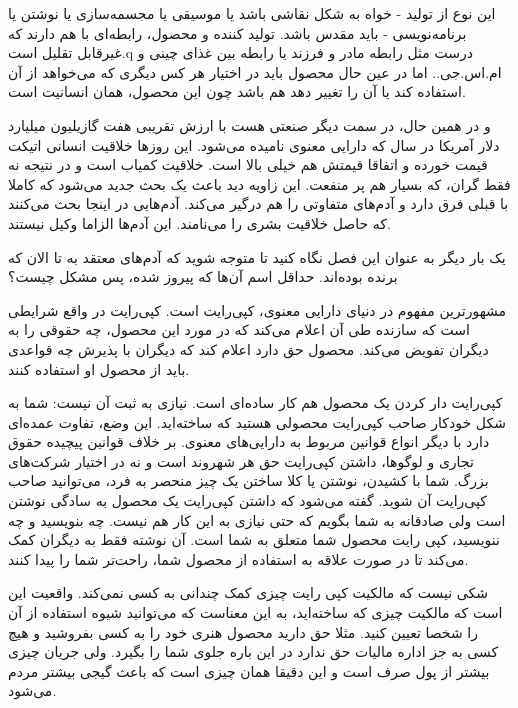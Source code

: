 این نوع از تولید - خواه به شکل نقاشی باشد یا موسیقی یا مجسمه‌سازی یا نوشتن یا برنامه‌نویسی - باید مقدس باشد. تولید کننده و محصول، رابطه‌ای با هم دارند که غیرقابل تقلیل است.q درست مثل رابطه مادر و فرزند یا رابطه بین غذای چینی و ام.اس.جی.. اما در عین حال محصول باید در اختیار هر کس دیگری که می‌خواهد از آن استفاده کند یا آن را تغییر دهد هم باشد چون این محصول، همان انسانیت است.

و در همین حال، در سمت دیگر صنعتی هست با ارزش تقریبی هفت گازیلیون
میلیارد دلار آمریکا در سال که دارایی معنوی نامیده می‌شود. این روزها
خلاقیت انسانی اتیکت قیمت خورده و اتفاقا قیمتش هم خیلی بالا است. خلاقیت
کمیاب است و در نتیجه نه فقط گران، که بسیار هم پر منفعت. این زاویه دید
باعث یک بحث جدید می‌شود که کاملا با قبلی فرق دارد و آدم‌های متفاوتی را
هم درگیر می‌کند. آدم‌هایی در اینجا بحث می‌کنند که حاصل خلاقیت بشری را
 می‌نامند. این آدم‌ها الزاما وکیل نیستند.

یک بار دیگر به عنوان این فصل نگاه کنید تا متوجه شوید که آدم‌های معتقد
به  تا الان که برنده بوده‌اند. حداقل اسم آن‌ها که پیروز
شده، پس مشکل چیست؟

مشهورترین مفهوم در دنیای دارایی معنوی، کپی‌رایت است. کپی‌رایت در واقع
شرایطی است که سازنده طی آن اعلام می‌کند که در مورد این محصول، چه حقوقی
را به دیگران تفویض می‌کند.  محصول حق دارد اعلام کند که
دیگران با پذیرش چه قواعدی باید از محصول او استفاده کنند.

کپی‌رایت دار کردن یک محصول هم کار ساده‌ای است. نیازی به ثبت آن نیست: شما
به شکل خودکار صاحب کپی‌رایت محصولی هستید که ساخته‌اید. این وضع، تفاوت
عمده‌ای دارد با دیگر انواع قوانین مربوط به دارایی‌های معنوی. بر خلاف
قوانین پیچیده حقوق تجاری و لوگوها، داشتن کپی‌رایت حق هر شهروند است و نه
در اختیار شرکت‌های بزرگ. شما با کشیدن، نوشتن یا کلا ساختن یک چیز منحصر
به فرد، می‌توانید صاحب کپی‌رایت آن شوید. گفته می‌شود که داشتن کپی‌رایت یک
محصول به سادگی نوشتن  است ولی
صادقانه به شما بگویم که حتی نیازی به این کار هم نیست. چه بنویسید و چه
ننویسید، کپی رایت محصول شما متعلق به شما است. آن نوشته فقط به دیگران
کمک می‌کند تا در صورت علاقه به استفاده از محصول شما، راحت‌تر شما را پیدا
کنند.

شکی نیست که مالکیت کپی رایت چیزی کمک چندانی به کسی نمی‌کند. واقعیت این
است که مالکیت چیزی که ساخته‌اید، به این معناست که می‌توانید شیوه استفاده
از آن را شخصا تعیین کنید. مثلا حق دارید محصول هنری خود را به کسی
بفروشید و هیچ کسی به جز اداره مالیات حق ندارد در این باره جلوی شما را
بگیرد. ولی جریان چیزی بیشتر از پول صرف است و این دقیقا همان چیزی است
که باعث گیجی بیشتر مردم می‌شود.


